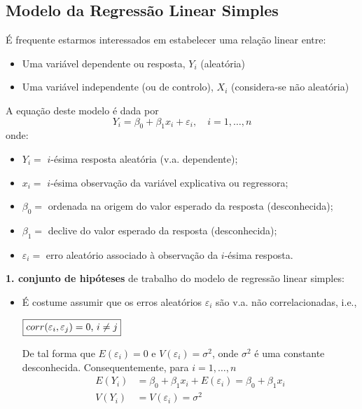 \subsection[7.1 Modelo da Regressão Linear Simples]{\hspace*{0.075 em}\raisebox{0.2 em}{$\pmb{\drsh}$} Modelo da Regressão Linear Simples}

\begin{mdframed}
    É frequente estarmos interessados em estabelecer uma relação linear entre:
    \begin{itemize}
        \item Uma variável dependente ou resposta, $Y_i$ (aleatória) 
        \item Uma variável independente (ou de controlo), $X_i$ (considera-se não aleatória)
    \end{itemize}
    A equação deste modelo é dada por
    $$
        \boxed{Y_i = \beta_0 + \beta_1 x_i + \varepsilon_i, \quad i=1,\dots,n}
    $$
    onde:
    \begin{itemize}
        \item $Y_i =$ $i$-ésima resposta aleatória (v.a. dependente);
        \item $x_i =$ $i$-ésima observação da variável explicativa ou regressora;
        \item $\beta_0 =$ ordenada na origem do valor esperado da resposta (desconhecida);
        \item $\beta_1 =$ declive do valor esperado da resposta (desconhecida);
        \item $\varepsilon_i =$ erro aleatório associado à observação da $i$-ésima resposta.
    \end{itemize}
\end{mdframed}

\noindent \textbf{1\textordmasculine{}. conjunto de hipóteses} de trabalho do modelo de regressão linear simples:
\begin{itemize}
    \item É costume assumir que os erros aleatórios $\varepsilon_i$ são v.a. não correlacionadas, i.e.,
    
    \hfil $\boxed{ corr(\varepsilon_i,\varepsilon_j)=0$, $i \neq j }$

    De tal forma que $E(\varepsilon_i) = 0$ e $V(\varepsilon_i) = \sigma^2$, onde $\sigma^2$ é uma constante desconhecida. Consequentemente, para $i = 1,\dots,n$
    $$
        \begin{aligned}
            E(Y_i) &= \beta_0 + \beta_1 x_i + E(\varepsilon_i) = \beta_0 + \beta_1 x_i \\
            V(Y_i) &= V(\varepsilon_i) = \sigma^2
        \end{aligned}
    $$
\end{itemize}

